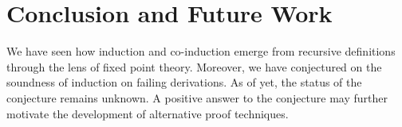\section{Conclusion and Future Work}
\label{sec-conclusion}
We have seen how induction and co-induction emerge from recursive definitions through the lens of fixed point theory. Moreover, we have conjectured on the soundness of induction on failing derivations. As of yet, the status of the conjecture remains unknown. A positive answer to the conjecture may further motivate the development of alternative proof techniques.